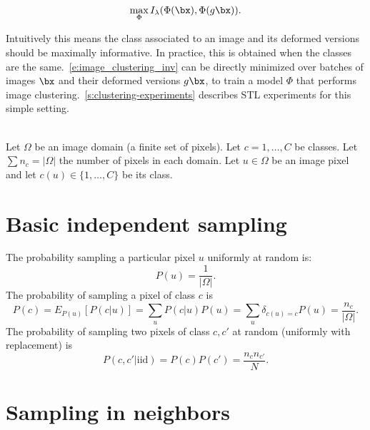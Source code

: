 \begin{equation} \label{scratch:e:image_clustering_inv}
\max_\Phi I_\lambda(\Phi(\bx),\Phi(g\bx)).
\end{equation}

Intuitively this means the class associated to an image and its deformed versions should be maximally informative. In practice, this is obtained when the classes are the same.~\cref{e:image_clustering_inv} can be directly minimized over batches of images $\bx$ and their deformed versions $g\bx$, to train a model $\Phi$ that performs image clustering.~\cref{s:clustering-experiments} describes STL experiments for this simple setting.



\\[5em]

Let $\Omega$ be an image domain (a finite set of pixels). Let $c=1,\dots,C$ be classes. Let $\sum n_c = |\Omega|$ the number of pixels in each domain. Let $u\in\Omega$ be an image pixel and let $c(u) \in\{ 1,\dots,C\}$ be its class.

\section{Basic independent sampling}

The probability sampling a particular pixel $u$ uniformly at random is:
$$
P(u) = \frac{1}{|\Omega|}.
$$
The probability of sampling a pixel of class $c$ is
$$
  P(c) = E_{P(u)}[P(c|u)]
  = \sum_u P(c|u) P(u)
  = \sum_u \delta_{c(u) = c} P(u)
  = \frac{n_c}{|\Omega|}.
$$
The probability of sampling two pixels of class $c,c'$ at random (uniformly with replacement) is
$$ 
 P(c,c'|\text{iid}) = P(c)P(c') = \frac{n_c n_{c'}}{N}.
$$

\section{Sampling in neighbors}

